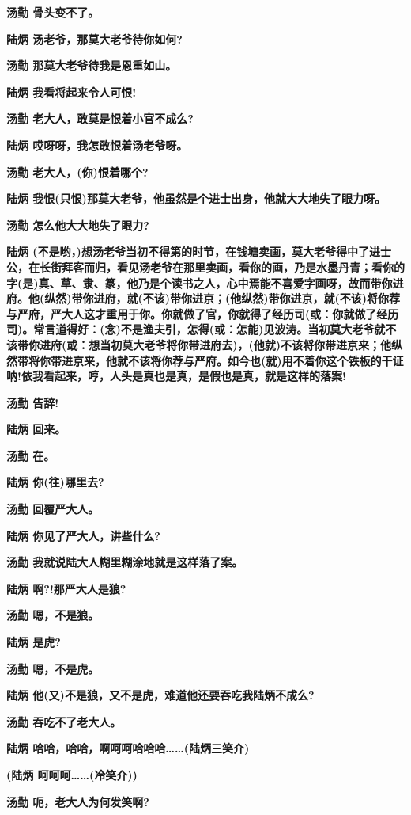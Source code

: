 \textbf{汤勤 骨头变不了。}

\textbf{陆炳 汤老爷，那莫大老爷待你如何?}

\textbf{汤勤 那莫大老爷待我是恩重如山。}

\textbf{陆炳 我看将起来令人可恨!}

\textbf{汤勤 老大人，敢莫是恨着小官不成么?}

\textbf{陆炳 哎呀呀，我怎敢恨着汤老爷呀。}

\textbf{汤勤 老大人，(你)恨着哪个?}

\textbf{陆炳
我恨(只恨)那莫大老爷，他虽然是个进士出身，他就大大地失了眼力呀。}

\textbf{汤勤 怎么他大大地失了眼力?}

\textbf{陆炳
(不是哟，)想汤老爷当初不得第的时节，在钱塘卖画，莫大老爷得中了进士公，在长街拜客而归，看见汤老爷在那里卖画，看你的画，乃是水墨丹青；看你的字(是)真、草、隶、篆，他乃是个读书之人，心中焉能不喜爱字画呀，故而带你进府。他(纵然)带你进府，就(不该)带你进京；(他纵然)带你进京，就(不该)将你荐与严府，严大人这才重用于你。你就做了官，你就得了经历司(或：你就做了经历司)。常言道得好：(念)不是渔夫引，怎得(或：怎能)见波涛。当初莫大老爷就不该带你进府(或：想当初莫大老爷将你带进府去)，(他就)不该将你带进京来；他纵然带将你带进京来，他就不该将你荐与严府。如今也(就)用不着你这个铁板的干证呐!依我看起来，哼，人头是真也是真，是假也是真，就是这样的落案!}

\textbf{汤勤 告辞!}

\textbf{陆炳 回来。}

\textbf{汤勤 在。}

\textbf{陆炳 你(往)哪里去?}

\textbf{汤勤 回覆严大人。}

\textbf{陆炳 你见了严大人，讲些什么?}

\textbf{汤勤 我就说陆大人糊里糊涂地就是这样落了案。}

\textbf{陆炳 啊?!那严大人是狼?}

\textbf{汤勤 嗯，不是狼。}

\textbf{陆炳 是虎?}

\textbf{汤勤 嗯，不是虎。}

\textbf{陆炳 他(又)不是狼，又不是虎，难道他还要吞吃我陆炳不成么?}

\textbf{汤勤 吞吃不了老大人。}

\textbf{陆炳 哈哈，哈哈，啊呵呵哈哈哈\ldots{}\ldots{}(陆炳三笑介)}

\textbf{(陆炳 呵呵呵\ldots{}\ldots{}(冷笑介))}

\textbf{汤勤 呃，老大人为何发笑啊?}

